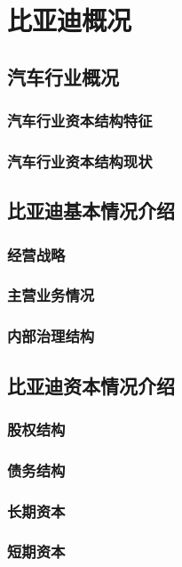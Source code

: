 \chapter{比亚迪概况}
\section{汽车行业概况}

\subsection{汽车行业资本结构特征}

\subsection{汽车行业资本结构现状}


\section{比亚迪基本情况介绍}
\subsection{经营战略}
\subsection{主营业务情况}
\subsection{内部治理结构}
\section{比亚迪资本情况介绍}
\subsection{股权结构}


\subsection{债务结构}


\subsection{长期资本}


\subsection{短期资本}
